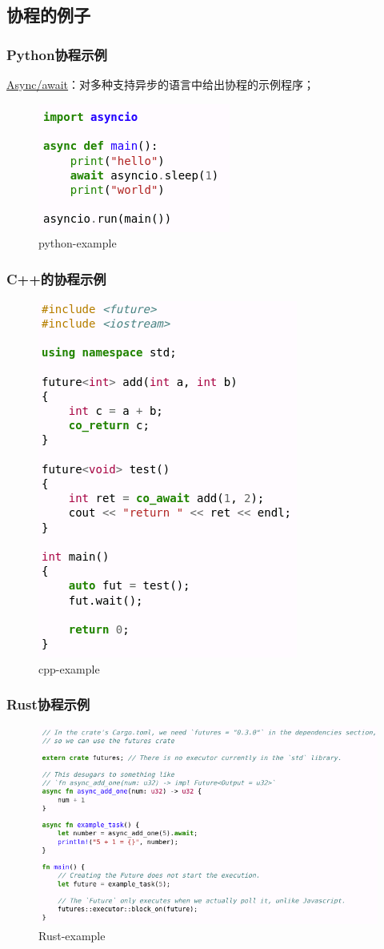 \subsection{协程的例子}
% 
\begin{frame}[fragile]
    \frametitle{Python协程示例}
% 
\href{https://en.wikipedia.org/wiki/Async/await}{Async/await}：对多种支持异步的语言中给出协程的示例程序；
% 
% 
% 
	\begin{figure}
		\centering
		\includegraphics[width=0.5\linewidth]{figs/python-example.png}
		\caption{python-example}
	\end{figure}


% 

\end{frame}
\begin{frame}[fragile]
    \frametitle{C++的协程示例}
% 
	\begin{figure}
		\centering
		\includegraphics[width=0.35\linewidth]{figs/cpp-example.png}
		\caption{cpp-example}
	\end{figure}


% 

\end{frame}
\begin{frame}[fragile]
    \frametitle{Rust协程示例}
% 
	\begin{figure}
		\centering
		\includegraphics[width=0.7\linewidth]{figs/Rust-example.png}
		\caption{Rust-example}
	\end{figure}

\end{frame}
